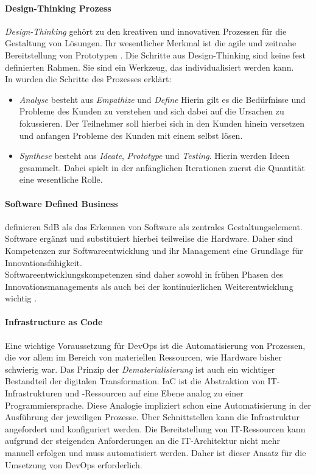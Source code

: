 \paragraph{Design-Thinking Prozess}
\label{def-design-thinking}
\emph{Design-Thinking} gehört zu den kreativen und innovativen Prozessen für die Gestaltung von Lösungen. Ihr wesentlicher Merkmal ist die agile und zeitnahe Bereitstellung von Prototypen \cite{Alt2017}. Die Schritte aus Design-Thinking sind keine fest definierten Rahmen. Sie sind ein Werkzeug, das individualisiert werden kann.
\medskip
\\
In \cite{yüksel:digit} wurden die Schritte des Prozesses erklärt: 
\begin{itemize}
    \item  \emph{Analyse} besteht aus \emph{Empathize} und \emph{Define} Hierin gilt es die Bedürfnisse und Probleme des Kunden zu verstehen und sich dabei auf die Ursachen zu fokussieren. Der Teilnehmer soll hierbei sich in den Kunden hinein versetzen und anfangen Probleme des Kunden mit einem selbst lösen. 
    \item \emph{Synthese} besteht aus \emph{Ideate}, \emph{Prototype} und \emph{Testing}. Hierin werden Ideen gesammelt. Dabei spielt in der anfänglichen Iterationen zuerst die Quantität eine wesentliche Rolle.
\end{itemize}

\paragraph{Software Defined Business}
\citet[S. 51]{Alt2017} definieren \ac{SdB} als das Erkennen von Software als zentrales Gestaltungselement. Software ergänzt und substituiert hierbei teilweilse die Hardware. Daher sind Kompetenzen zur Softwareentwicklung und ihr Management eine Grundlage für Innovationsfähigkeit.
\medskip
\\
Softwareentwicklungskompetenzen sind daher sowohl in frühen Phasen des Innovationsmanagements als auch bei der kontinuierlichen Weiterentwicklung wichtig \cite{Alt2017}.
%
%
%

\paragraph{Infrastructure as Code}
Eine wichtige Voraussetzung für DevOps ist die Automatisierung von Prozessen, die vor allem im Bereich von materiellen Ressourcen, wie Hardware bisher schwierig war. Das Prinzip der \emph{Dematerialisierung} ist auch ein wichtiger Bestandteil der digitalen Transformation.
\ac{IaC} ist die Abstraktion von IT-Infrastrukturen und -Ressourcen auf eine Ebene analog zu einer Programmiersprache. Diese Analogie impliziert schon eine Automatisierung in der Ausführung der jeweiligen Prozesse. Über Schnittstellen kann die Infrastruktur angefordert und konfiguriert werden. Die Bereitstellung von IT-Ressourcen kann aufgrund der steigenden Anforderungen an die IT-Architektur \cite{Brockhoff2006, Bussmann2006, Alt2017} nicht mehr manuell erfolgen und muss automatisiert werden. Daher ist dieser Ansatz für die Umsetzung von DevOps erforderlich.


